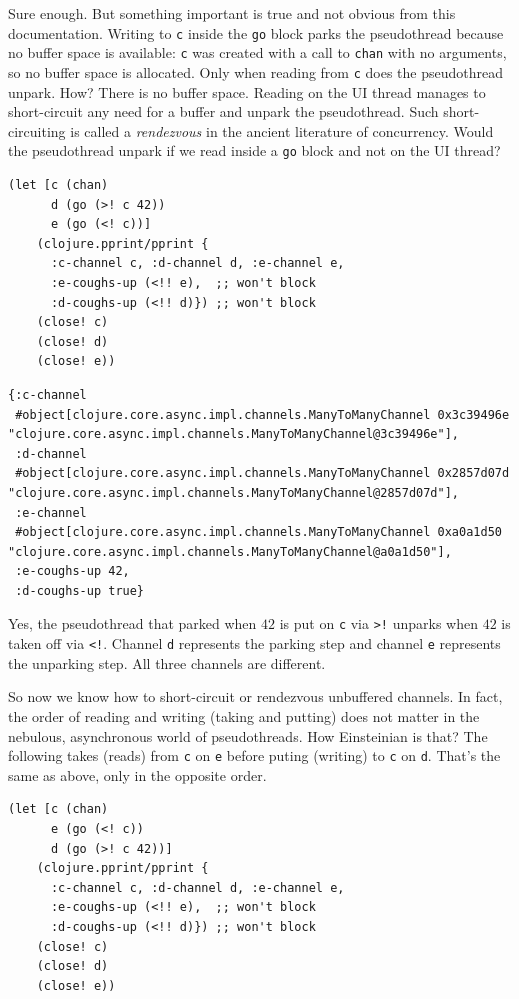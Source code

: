 \documentclass[10pt,oneside,x11names]{article}
\begin{document}
Sure enough. But something important is true and not obvious from this
documentation. Writing to \texttt{c} inside the \texttt{go} block parks the
pseudothread because no buffer space is available: \texttt{c} was created with
a call to \texttt{chan} with no arguments, so no buffer space is allocated.
Only when reading from \texttt{c} does the pseudothread unpark. How? There is
no buffer space. Reading on the UI thread manages to short-circuit any
need for a buffer and unpark the pseudothread. Such short-circuiting is
called a \emph{rendezvous} in the ancient literature of concurrency. Would
the pseudothread unpark if we read inside a \texttt{go} block and not on the UI
thread?

\begin{verbatim}
(let [c (chan)
      d (go (>! c 42))
      e (go (<! c))]
    (clojure.pprint/pprint {
      :c-channel c, :d-channel d, :e-channel e,
      :e-coughs-up (<!! e),  ;; won't block
      :d-coughs-up (<!! d)}) ;; won't block
    (close! c)
    (close! d)
    (close! e))
\end{verbatim}

\begin{verbatim}
{:c-channel
 #object[clojure.core.async.impl.channels.ManyToManyChannel 0x3c39496e "clojure.core.async.impl.channels.ManyToManyChannel@3c39496e"],
 :d-channel
 #object[clojure.core.async.impl.channels.ManyToManyChannel 0x2857d07d "clojure.core.async.impl.channels.ManyToManyChannel@2857d07d"],
 :e-channel
 #object[clojure.core.async.impl.channels.ManyToManyChannel 0xa0a1d50 "clojure.core.async.impl.channels.ManyToManyChannel@a0a1d50"],
 :e-coughs-up 42,
 :d-coughs-up true}
\end{verbatim}


Yes, the pseudothread that parked when \(42\) is put on \texttt{c} via \texttt{>!}
unparks when \(42\) is taken off via \texttt{<!}. Channel \texttt{d} represents the
parking step and channel \texttt{e} represents the unparking step. All three
channels are different.

So now we know how to short-circuit or rendezvous unbuffered channels.
In fact, the order of reading and writing (taking and putting) does not
matter in the nebulous, asynchronous world of pseudothreads. How
Einsteinian is that? The following takes (reads) from \texttt{c} on \texttt{e} before
puting (writing) to \texttt{c} on \texttt{d}. That's the same as above, only in the
opposite order.

\begin{verbatim}
(let [c (chan)
      e (go (<! c))
      d (go (>! c 42))]
    (clojure.pprint/pprint {
      :c-channel c, :d-channel d, :e-channel e,
      :e-coughs-up (<!! e),  ;; won't block
      :d-coughs-up (<!! d)}) ;; won't block
    (close! c)
    (close! d)
    (close! e))
\end{verbatim}
\end{document}
